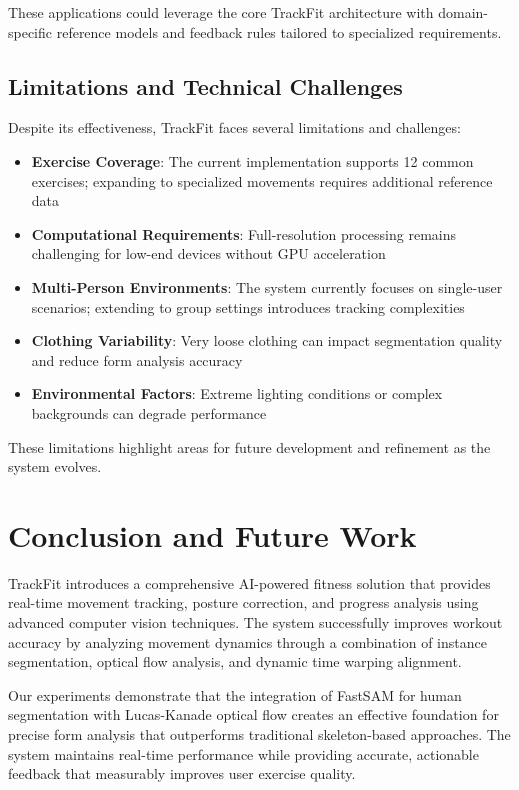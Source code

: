 \documentclass[conference]{IEEEtran}
\begin{document}
These applications could leverage the core TrackFit architecture with domain-specific reference models and feedback rules tailored to specialized requirements.

\subsection{Limitations and Technical Challenges}
Despite its effectiveness, TrackFit faces several limitations and challenges:

\begin{itemize}
    \item \textbf{Exercise Coverage}: The current implementation supports 12 common exercises; expanding to specialized movements requires additional reference data
    \item \textbf{Computational Requirements}: Full-resolution processing remains challenging for low-end devices without GPU acceleration
    \item \textbf{Multi-Person Environments}: The system currently focuses on single-user scenarios; extending to group settings introduces tracking complexities
    \item \textbf{Clothing Variability}: Very loose clothing can impact segmentation quality and reduce form analysis accuracy
    \item \textbf{Environmental Factors}: Extreme lighting conditions or complex backgrounds can degrade performance
\end{itemize}

These limitations highlight areas for future development and refinement as the system evolves.

\section{Conclusion and Future Work}
TrackFit introduces a comprehensive AI-powered fitness solution that provides real-time movement tracking, posture correction, and progress analysis using advanced computer vision techniques. The system successfully improves workout accuracy by analyzing movement dynamics through a combination of instance segmentation, optical flow analysis, and dynamic time warping alignment.

Our experiments demonstrate that the integration of FastSAM for human segmentation with Lucas-Kanade optical flow creates an effective foundation for precise form analysis that outperforms traditional skeleton-based approaches. The system maintains real-time performance while providing accurate, actionable feedback that measurably improves user exercise quality.
\end{document}
